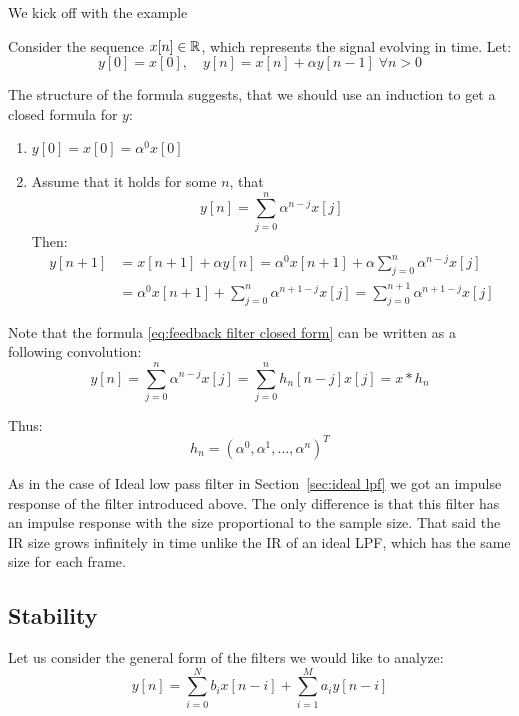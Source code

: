 We kick off with the example
\begin{example} \label{ex:feedback filter}
    Consider the sequence $x[n] \in \mathbb{R}$, which represents the signal evolving in time. Let:
    \begin{equation*}
        y[0] = x[0], \quad y[n] = x[n] + \alpha y[n-1] \; \forall n > 0
    \end{equation*}

    The structure of the formula suggests, that we should use an induction to get a closed formula for $y$:

    \begin{enumerate}
        \item[Base.] $y[0] = x[0] = \alpha^0 x[0]$
        \item[Step.] Assume that it holds for some $n$, that
              \begin{equation}
                  y[n] = \sum_{j=0}^{n} \alpha^{n-j} x[j]
                  \label{eq:feedback filter closed form}
              \end{equation}
              Then:
              \[\begin{aligned}
                      y[n + 1]
                       & = x[n + 1] + \alpha y[n]
                      = \alpha^0 x[n + 1] + \alpha \sum_{j=0}^{n} \alpha^{n-j} x[j]
                      \\ & = \alpha^0 x[n + 1] + \sum_{j=0}^{n} \alpha^{n+1-j} x[j]
                      = \sum_{j=0}^{n + 1} \alpha^{n+1-j} x[j]
                  \end{aligned}\]
    \end{enumerate}

    Note that the formula \eqref{eq:feedback filter closed form} can be written as a following convolution:
    \[y[n]
        = \sum_{j=0}^{n} \alpha^{n-j} x[j]
        = \sum_{j=0}^{n} h_n[n-j] x[j]
        = x \ast h_n\]

    Thus:
    \[h_n = {\left(\alpha^0, \alpha^1, \dots, \alpha^{n}\right)}^{T}\]

    As in the case of Ideal low pass filter in Section~\ref{sec:ideal lpf} we got an impulse response of the filter introduced above. The only difference is that this filter has an impulse response with the size proportional to the sample size. That said the IR size grows infinitely in time unlike the IR of an ideal LPF, which has the same size for each frame.
\end{example}

\subsection{Stability}
Let us consider the general form of the filters we would like to analyze:
\begin{equation}
    y[n] = \sum_{i=0}^{N} b_i x[n - i] + \sum_{i=1}^{M} a_i y[n - i] \label{eq:IIR def}
\end{equation}

